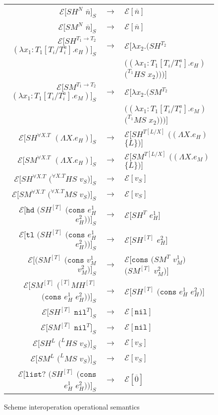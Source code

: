 \begin{figure}[p]
\centering
\begin{tabular}{rcl}
$\mathscr{E}[SH^{N}$ $\overline{n}]_{S}$ & $\rightarrow$ & $\mathscr{E}[\overline{n}]$ \\
$\mathscr{E}[SM^{N}$ $\overline{n}]_{S}$ & $\rightarrow$ & $\mathscr{E}[\overline{n}]$ \\
$\mathscr{E}[SH^{T_{1}\rightarrow T_{2}}$ $(\lambda x_{1}:T_{1}[T_{i}/T_{i}^{a}].e_{H})]_{S}$ & $\rightarrow$ & $\mathscr{E}[\lambda x_{2}.(SH^{T_{2}}$ \\
&& $((\lambda x_{1}:T_{1}[T_{i}/T_{i}^{a}].e_{H})$ $(^{T_{1}}HS$ $x_{2})))]$ \\
$\mathscr{E}[SM^{T_{1}\rightarrow T_{2}}$ $(\lambda x_{1}:T_{1}[T_{i}/T_{i}^{a}].e_{M})]_{S}$ & $\rightarrow$ & $\mathscr{E}[\lambda x_{2}.(SM^{T_{2}}$ \\
&& $((\lambda x_{1}:T_{1}[T_{i}/T_{i}^{a}].e_{M})$ $(^{T_{1}}MS$ $x_{2})))]$ \\
$\mathscr{E}[SH^{\forall X.T}$ $(\Lambda X.e_{H})]_{S}$ & $\rightarrow$ & $\mathscr{E}[SH^{T[L/X]}$ $((\Lambda X.e_{H})$ $\lbrace L\rbrace)]$ \\
$\mathscr{E}[SM^{\forall X.T}$ $(\Lambda X.e_{H})]_{S}$ & $\rightarrow$ & $\mathscr{E}[SM^{T[L/X]}$ $((\Lambda X.e_{M})$ $\lbrace L\rbrace)]$ \\
$\mathscr{E}[SH^{\forall X.T}$ $(^{\forall X.T}HS$ $v_{S})]_{S}$ & $\rightarrow$ & $\mathscr{E}[v_{S}]$ \\
$\mathscr{E}[SM^{\forall X.T}$ $(^{\forall X.T}MS$ $v_{S})]_{S}$ & $\rightarrow$ & $\mathscr{E}[v_{S}]$ \\
$\mathscr{E}[\mathtt{hd}$ $(SH^{[T]}$ $(\mathtt{cons}$ $e_{H}^{1}$ $e_{H}^{2}))]_{S}$ & $\rightarrow$ & $\mathscr{E}[SH^{T}$ $e_{H}^{1}]$ \\
$\mathscr{E}[\mathtt{tl}$ $(SH^{[T]}$ $(\mathtt{cons}$ $e_{H}^{1}$ $e_{H}^{2}))]_{S}$ & $\rightarrow$ & $\mathscr{E}[SH^{[T]}$ $e_{H}^{2}]$ \\
$\mathscr{E}[(SM^{[T]}$ $(\mathtt{cons}$ $v_{M}^{1}$ $v_{M}^{2})]_{S}$ & $\rightarrow$ & $\mathscr{E}[\mathtt{cons}$ $(SM^{T}$ $v_{M}^{1})$ $(SM^{[T]}$ $v_{M}^{2})]$ \\
$\mathscr{E}[SM^{[T]}$ $(^{[T]}MH^{[T]}$ $(\mathtt{cons}$ $e_{H}^{1}$ $e_{H}^{2}))]_{S}$ & $\rightarrow$ & $\mathscr{E}[SH^{[T]}$ $(\mathtt{cons}$ $e_{H}^{1}$ $e_{H}^{2})]$ \\
$\mathscr{E}[SH^{[T]}$ $\mathtt{nil}^{T}]_{S}$ & $\rightarrow$ & $\mathscr{E}[\mathtt{nil}]$ \\
$\mathscr{E}[SM^{[T]}$ $\mathtt{nil}^{T}]_{S}$ & $\rightarrow$ & $\mathscr{E}[\mathtt{nil}]$ \\
$\mathscr{E}[SH^{L}$ $(^{L}HS$ $v_{S})]_{S}$ & $\rightarrow$ & $\mathscr{E}[v_{S}]$ \\
$\mathscr{E}[SM^{L}$ $(^{L}MS$ $v_{S})]_{S}$ & $\rightarrow$ & $\mathscr{E}[v_{S}]$ \\
$\mathscr{E}[\mathtt{list?}$ $(SH^{[T]}$ $(\mathtt{cons}$ $e_{H}^{1}$ $e_{H}^{2}))]_{S}$ & $\rightarrow$ & $\mathscr{E}[\overline{0}]$ \\
\end{tabular}
\caption{Scheme interoperation operational semantics}
\label{sios}
\end{figure}